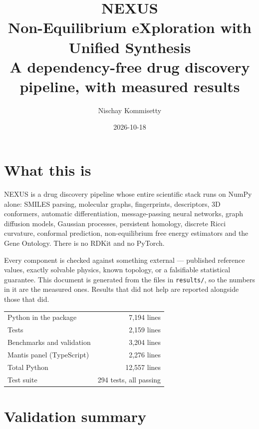 \documentclass[11pt]{article}
\title{\textbf{NEXUS}\\[0.3em]
\large Non-Equilibrium eXploration with Unified Synthesis\\[0.2em]
\normalsize A dependency-free drug discovery pipeline, with measured results}
\author{Nischay Kommisetty}
\date{2026-10-18}
\begin{document}
\maketitle

\section*{What this is}

NEXUS is a drug discovery pipeline whose entire scientific stack runs on NumPy alone:
SMILES parsing, molecular graphs, fingerprints, descriptors, 3D conformers, automatic
differentiation, message-passing neural networks, graph diffusion models, Gaussian
processes, persistent homology, discrete Ricci curvature, conformal prediction,
non-equilibrium free energy estimators and the Gene Ontology. There is no RDKit and no
PyTorch.

Every component is checked against something external --- published reference values,
exactly solvable physics, known topology, or a falsifiable statistical guarantee.
This document is generated from the files in \texttt{results/}, so the numbers in it are
the measured ones. Results that did not help are reported alongside those that did.

\vspace{0.5em}
\begin{tabular}{lr}
\toprule
Python in the package & 7,194 lines \\
Tests & 2,159 lines \\
Benchmarks and validation & 3,204 lines \\
Mantis panel (TypeScript) & 2,276 lines \\
\midrule
Total Python & 12,557 lines \\
Test suite & 294 tests, all passing \\
\bottomrule
\end{tabular}

\section{Validation summary}
\end{document}

